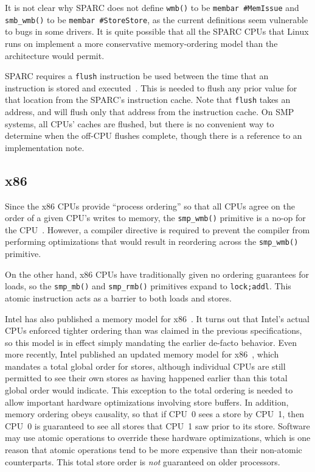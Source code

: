 It is not clear why SPARC does not define {\tt wmb()} to be
{\tt membar \#MemIssue} and {\tt smb\_wmb()} to be
{\tt membar \#StoreStore},
as the current definitions seem vulnerable to bugs in some drivers.
It is quite possible that all the SPARC CPUs that Linux runs on
implement a more conservative memory-ordering model than the architecture
would permit.

SPARC requires a {\tt flush} instruction be used between the time that
an instruction is stored and executed~\cite{SPARC94}.
This is needed to flush any prior value for that location from
the SPARC's instruction cache.
Note that {\tt flush} takes an address, and will flush only that address
from the instruction cache.
On SMP systems, all CPUs' caches are flushed, but there is no
convenient way to determine when the off-CPU flushes complete,
though there is a reference to an implementation note.

\subsection{x86}

Since the x86 CPUs provide ``process ordering'' so that all CPUs agree
on the order of a given CPU's writes to memory, the {\tt smp\_wmb()} primitive
is a no-op for the CPU~\cite{IntelXeonV3-96a}.
However, a compiler directive is required to
prevent the compiler from performing optimizations that would result
in reordering across the {\tt smp\_wmb()} primitive.

On the other hand, x86 CPUs have traditionally given
no ordering guarantees for loads, so
the {\tt smp\_mb()} and {\tt smp\_rmb()} primitives expand to {\tt lock;addl}.
This atomic instruction acts as a barrier to both loads and stores.

Intel has also published a memory model for
x86~\cite{Intelx86MemoryOrdering2007}.
It turns out that Intel's actual CPUs enforced tighter ordering than
was claimed in the previous specifications, so this model is in effect
simply mandating the earlier de-facto behavior.
Even more recently, Intel published an updated memory model for
x86~\cite[Section 8.2]{Intel64IA32v3A2011}, which mandates a total global order
for stores, although individual CPUs are still permitted to see their
own stores as having happened earlier than this total global order
would indicate.
This exception to the total ordering is needed to allow important
hardware optimizations involving store buffers.
In addition, memory ordering obeys causality, so that if CPU~0 sees a
store by CPU~1, then CPU~0 is guaranteed to see all stores that CPU~1
saw prior to its store.
Software may use atomic operations to override these hardware optimizations,
which is one reason that atomic operations tend to be more expensive
than their non-atomic counterparts.
This total store order is \emph{not} guaranteed on older processors.

